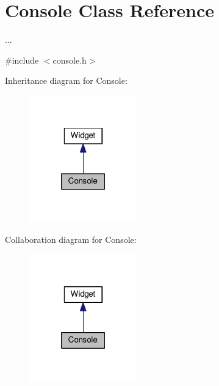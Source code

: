 \hypertarget{class_console}{}\section{Console Class Reference}
\label{class_console}


...  




{\ttfamily \#include $<$console.\+h$>$}



Inheritance diagram for Console\+:\nopagebreak
\begin{figure}[H]
\begin{center}
\leavevmode
\includegraphics[width=133pt]{class_console__inherit__graph}
\end{center}
\end{figure}


Collaboration diagram for Console\+:\nopagebreak
\begin{figure}[H]
\begin{center}
\leavevmode
\includegraphics[width=133pt]{class_console__coll__graph}
\end{center}
\end{figure}
